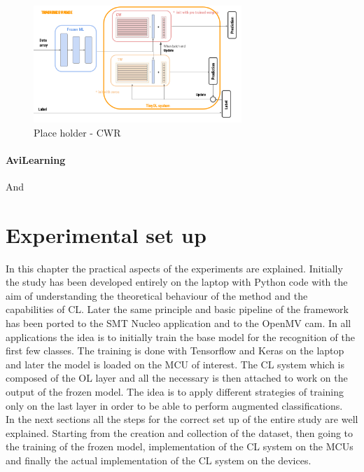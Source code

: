 \documentclass[12pt]{report}
\begin{document}
%
\begin{figure}[h!]
    \centering
    \includegraphics[width=0.7\textwidth]{Figures/Chapter3/CWR.png} 
    \caption{Place holder - CWR}
    \label{fig:block_diag_CWR}    
\end{figure}
%
\subsubsection{AviLearning}





And







\chapter{Experimental set up}

In this chapter the practical aspects of the experiments are explained. Initially the study has been developed entirely on the laptop with Python code with the aim of understanding the theoretical behaviour of the method and the capabilities of CL. Later the same principle and basic pipeline of the framework has been ported to the SMT Nucleo application and to the OpenMV cam. In all applications the idea is to initially train the base model for the recognition of the first few classes. The training is done with Tensorflow and Keras on the laptop and later the model is loaded on the MCU of interest. The CL system which is composed of the OL layer and all the necessary is then attached to work on the output of the frozen model. The idea is to apply different strategies of training only on the last layer in order to be able to perform augmented classifications.  \\
In the next sections all the steps for the correct set up of the entire study are well explained. Starting from the creation and collection of the dataset, then going to the training of the frozen model, implementation of the CL system on the MCUs and finally the actual implementation of the CL system on the devices. 
\end{document}
